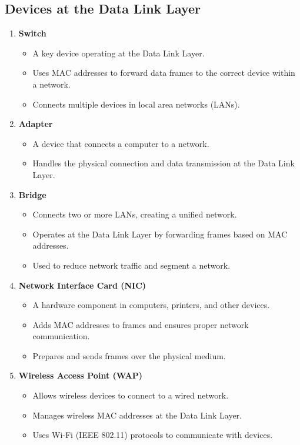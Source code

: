 \documentclass[12pt,a4paper]{article}
\begin{document}
\subsection*{Devices at the Data Link Layer}
\begin{enumerate}
    \item \textbf{Switch}
    \begin{itemize}
        \item A key device operating at the Data Link Layer.
        \item Uses MAC addresses to forward data frames to the correct device within a network.
        \item Connects multiple devices in local area networks (LANs).
    \end{itemize}

    \item \textbf{Adapter}
    \begin{itemize}
        \item A device that connects a computer to a network.
        \item Handles the physical connection and data transmission at the Data Link Layer.
    \end{itemize}

    \item \textbf{Bridge}
    \begin{itemize}
        \item Connects two or more LANs, creating a unified network.
        \item Operates at the Data Link Layer by forwarding frames based on MAC addresses.
        \item Used to reduce network traffic and segment a network.
    \end{itemize}
    
    \item \textbf{Network Interface Card (NIC)}
    \begin{itemize}
        \item A hardware component in computers, printers, and other devices.
        \item Adds MAC addresses to frames and ensures proper network communication.
        \item Prepares and sends frames over the physical medium.
    \end{itemize}
    
    \item \textbf{Wireless Access Point (WAP)}
    \begin{itemize}
        \item Allows wireless devices to connect to a wired network.
        \item Manages wireless MAC addresses at the Data Link Layer.
        \item Uses Wi-Fi (IEEE 802.11) protocols to communicate with devices.
    \end{itemize}
\end{enumerate}
\end{document}
